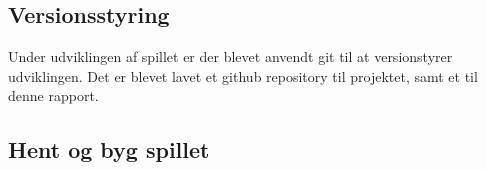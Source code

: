 \subsection{Versionsstyring}
Under udviklingen af spillet er der blevet anvendt git til at versionstyrer udviklingen. Det er blevet lavet et github repository til projektet, samt et til denne rapport.

\subsection{Hent og byg spillet}

